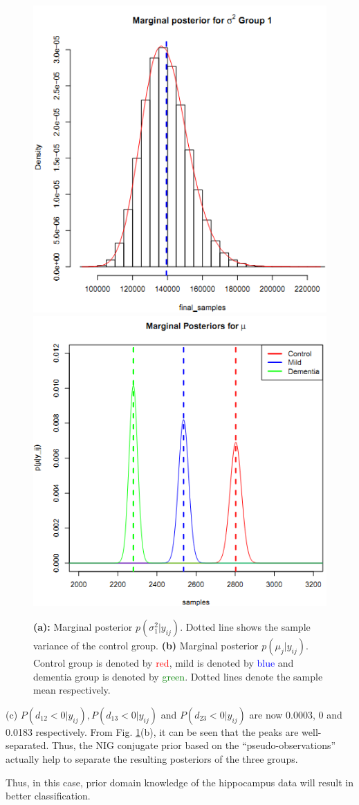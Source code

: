 \documentclass[11pt]{article}
\begin{document}
\begin{figure}[t]
 \includegraphics[width=0.5\linewidth] {img6a.png} 
 \includegraphics[width=0.5\linewidth] {img6b.png} 
\caption{\small{ {\bf (a):} Marginal posterior $p(\sigma^{2}_{1} | y_{ij})$. Dotted line shows the sample variance of the control group. {\bf (b)} Marginal posterior $p(\mu_{j} | y_{ij})$. Control group is denoted by \textcolor{red}{red}, mild is denoted by \textcolor{blue}{blue} and dementia group is denoted by \textcolor{green}{green}. Dotted lines denote the sample mean respectively. }}
\label{fig6ab}
\end{figure}

\par (c) $P(d_{12} < 0 | y_{ij}), P(d_{13} < 0 | y_{ij})$ and $P(d_{23} < 0 | y_{ij})$ are now 0.0003, 0 and 0.0183 respectively. From Fig. \ref{fig6ab}(b), it can be seen that the peaks are well-separated. Thus, the NIG conjugate prior based on the ``pseudo-observations'' actually help to separate the resulting posteriors of the three groups. 

\par Thus, in this case, prior domain knowledge of the hippocampus data will result in better classification. 
\end{document}
